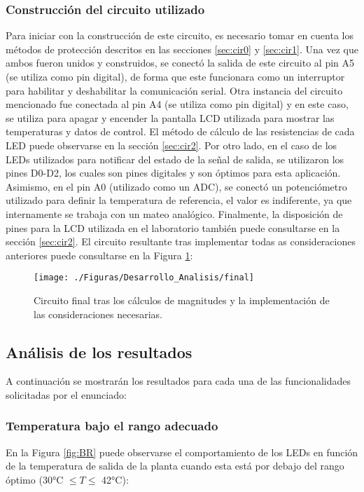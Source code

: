 \subsubsection{Construcción del circuito utilizado}
Para iniciar con la construcción de este circuito, es necesario tomar en cuenta los métodos de protección descritos en las secciones \ref{sec:cir0} y \ref{sec:cir1}. Una vez que ambos fueron unidos y construidos, se conectó la salida de este circuito al pin A5 (se utiliza como pin digital), de forma que este funcionara como un interruptor para habilitar y deshabilitar la comunicación serial. Otra instancia del circuito mencionado fue conectada al pin A4 (se utiliza como pin digital) y en este caso, se utiliza para apagar y encender la pantalla LCD utilizada para mostrar las temperaturas y datos de control. El método de cálculo de las resistencias de cada LED puede observarse en la sección \ref{sec:cir2}. Por otro lado, en el caso de los LEDs utilizados para notificar del estado de la señal de salida, se utilizaron los pines D0-D2, los cuales son pines digitales y son óptimos para esta aplicación. Asimismo, en el pin A0 (utilizado como un ADC), se conectó un potenciómetro utilizado para definir la temperatura de referencia, el valor es indiferente, ya que internamente se trabaja con un mateo analógico. Finalmente, la disposición de pines para la LCD utilizada en el laboratorio también puede consultarse en la sección \ref{sec:cir2}. El circuito resultante tras implementar todas as consideraciones anteriores puede consultarse en la Figura \ref{fig:final}:

\begin{figure}[H]
\centering
\texttt{[image: ./Figuras/Desarrollo\_Analisis/final]}
\caption{Circuito final tras los cálculos de magnitudes y la implementación de las consideraciones necesarias.} 
\label{fig:final}
\end{figure}

\subsection{Análisis de los resultados}
 A continuación se mostrarán los resultados para cada una de las funcionalidades solicitadas por el enunciado: 

\subsubsection{Temperatura bajo el rango adecuado}
En la Figura \ref{fig:BR} puede observarse el comportamiento de los LEDs en función de la temperatura de salida de la planta cuando esta está por debajo del rango óptimo (30°C $\leq T \leq$ 42°C):

